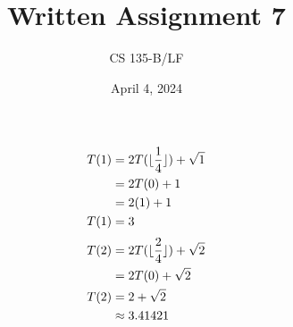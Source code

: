 \documentclass{article}
\title{Written Assignment 7}
\author{CS 135-B/LF}
\date{April 4, 2024}
\DeclarePairedDelimiter{\floor}{\lfloor}{\rfloor}
\begin{document}
\maketitle
\raggedright

\section{}
\subsection{}
\begin{align*}
    T(1) &= 2T(\floor{\frac{1}{4}}) + \sqrt{1} \\
         &= 2T(0) + 1 \\
         &= 2(1) + 1 \\
    T(1) &= 3
\end{align*}
\begin{align*}
    T(2) &= 2T(\floor{\frac{2}{4}}) + \sqrt{2} \\
         &= 2T(0) + \sqrt{2} \\
    T(2) &= 2 + \sqrt{2}\\
         &\approx 3.41421
\end{align*}
\end{document}
